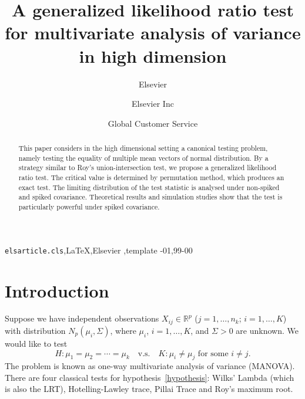 \documentclass[review]{elsarticle}
\theoremstyle{plain}
\theoremstyle{definition}
\theoremstyle{remark}
\begin{document}
\begin{frontmatter}

\title{A generalized likelihood ratio test for multivariate analysis of variance in high dimension}

\author{Elsevier}
\address{Radarweg 29, Amsterdam}

\author[mymainaddress,mysecondaryaddress]{Elsevier Inc}

\author[mysecondaryaddress]{Global Customer Service}

\address[mymainaddress]{1600 John F Kennedy Boulevard, Philadelphia}
\address[mysecondaryaddress]{360 Park Avenue South, New York}

\begin{abstract}
    This paper considers in the high dimensional setting a canonical testing problem, namely testing the equality of multiple mean vectors of normal distribution.
    By a strategy similar to Roy's union-intersection test, we propose a generalized likelihood ratio test.
    The critical value is determined by permutation method, which produces an exact test.
    The limiting distribution of the test statistic is analysed under non-spiked and spiked covariance.
    Theoretical results and simulation studies show that the test is particularly powerful under spiked covariance.
\end{abstract}

\begin{keyword}
\texttt{elsarticle.cls}\sep \LaTeX\sep Elsevier \sep template
-01\sep  99-00
\end{keyword}

\end{frontmatter}

\linenumbers
\section{Introduction}
Suppose we have independent observations $X_{ij}\in \mathbb{R}^p$ ($j=1,\ldots,n_k$; $i=1,\ldots, K$) with distribution $N_p(\mu_i,\Sigma)$, where $\mu_i$, $i=1,\ldots,K$, and $\Sigma>0$ are unknown. We would like to test
\begin{equation}\label{hypothesis}
    H: \mu_1=\mu_2=\cdots=\mu_k\quad \text{v.s.}\quad K: \text{$\mu_i\neq \mu_j$ for some $i\neq j$}.
\end{equation}
The problem is known as one-way multivariate analysis of variance (MANOVA).
There are four classical tests for hypothesis~\eqref{hypothesis}: Wilks' Lambda (which is also the LRT), Hotelling-Lawley trace, Pillai Trace and Roy's maximum root.
\end{document}

